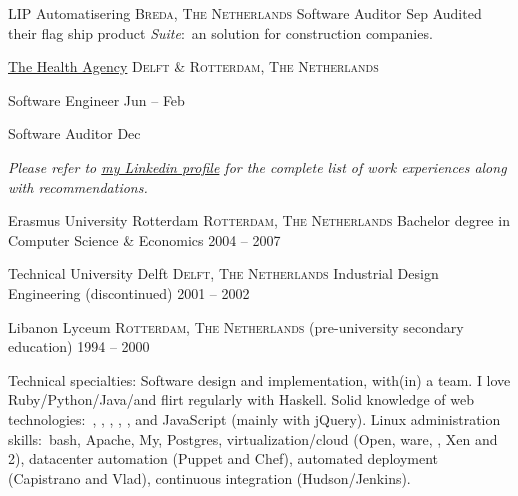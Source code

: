 \documentclass[10pt,a4paper]{article}
\begin{document}
\headedsection
  {LIP Automatisering}
  {\textsc{Breda, The Netherlands}} {%
  \headedsubsection
    {Software Auditor}
    {Sep }
    {\bodytext
      {Audited their flag ship product \emph{ Suite}:\ an  solution for construction companies.}}
}

\headedsection
  {\href{http://www.thehealthagency.com}{The Health Agency}}
  {\textsc{Delft \& Rotterdam, The Netherlands}} {%

  \headedsubsection
    {Software Engineer}
    {Jun  -- Feb }
    {}

  \headedsubsection
    {Software Auditor}
    {Dec }
    {}
}

\begin{center}
  \emph{Please refer to \href{http://www.linkedin.com/in/ciesbreijs}{my Linkedin profile} for the complete list of work experiences along with recommendations.}
\end{center}


\spacedhrule{-0.2em}{-0.4em}


\headedsection
  {Erasmus University Rotterdam}
  {\textsc{Rotterdam, The Netherlands}} {%
  \headedsubsection
    {Bachelor degree in Computer Science \& Economics}
    {2004 -- 2007}
    {}
}

\headedsection
  {Technical University Delft}
  {\textsc{Delft, The Netherlands}} {%
  \headedsubsection
    {Industrial Design Engineering \textnormal{(discontinued)}}
    {2001 -- 2002} {}
}

\headedsection
  {Libanon Lyceum}
  {\textsc{Rotterdam, The Netherlands}} {%
  \headedsubsection
    { \textnormal{(pre-university secondary education)}}
    {1994 -- 2000} {}
}


\spacedhrule{0.5em}{-0.4em}


\inlineheadsection  %
  {Technical specialties:}
  {Software design and implementation, with(in) a team.  I love Ruby/\nsp Python/\nsp Java/\nsp \CPP and flirt regularly with Haskell.  Solid knowledge of web technologies:\ , , , , ,  and JavaScript (mainly with jQuery).  Linux administration skills:\ bash, Apache, My, Postgres, virtualization/cloud (Open, ware, , Xen and 2), datacenter automation (Puppet and Chef), automated deployment (Capistrano and Vlad), continuous integration (Hudson/Jenkins).}
\end{document}
